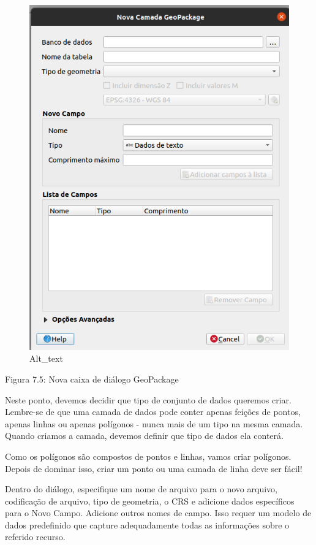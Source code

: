 \documentclass[
  portuguese,
]{krantz}
\begin{document}
\begin{figure}
\centering
\includegraphics{media/modulo7/new-vector.png}
\caption{Alt\_text}
\end{figure}

Figura 7.5: Nova caixa de diálogo GeoPackage

Neste ponto, devemos decidir que tipo de conjunto de dados queremos criar. Lembre-se de que uma camada de dados pode conter apenas feições de pontos, apenas linhas ou apenas polígonos - nunca mais de um tipo na mesma camada. Quando criamos a camada, devemos definir que tipo de dados ela conterá.

Como os polígonos são compostos de pontos e linhas, vamos criar polígonos. Depois de dominar isso, criar um ponto ou uma camada de linha deve ser fácil!

Dentro do diálogo, especifique um nome de arquivo para o novo arquivo, codificação de arquivo, tipo de geometria, o CRS e adicione dados específicos para o Novo Campo. Adicione outros nomes de campo. Isso requer um modelo de dados predefinido que capture adequadamente todas as informações sobre o referido recurso.
\end{document}

